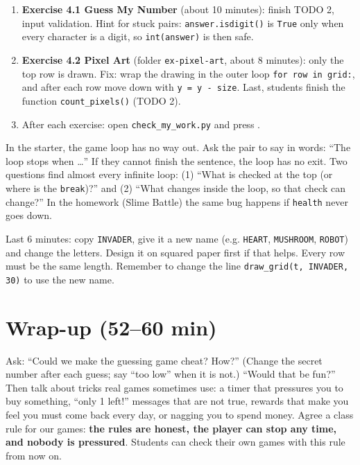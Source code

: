 \begin{enumerate}[leftmargin=1.4em]
  \item \textbf{Exercise 4.1 Guess My Number} (about 10 minutes): finish TODO 2, input validation. Hint for stuck pairs:
        \texttt{answer.isdigit()} is \texttt{True} only when every character is a digit, so \texttt{int(answer)} is then safe.
  \item \textbf{Exercise 4.2 Pixel Art} (folder \texttt{ex-pixel-art}, about 8 minutes): only the top row is drawn.
        Fix: wrap the drawing in the outer loop \texttt{for row in grid:}, and after each row move down
        with \texttt{y = y - size}. Last, students finish the function \texttt{count\_pixels()} (TODO 2).
  \item After each exercise: open \texttt{check\_my\_work.py} and press .
\end{enumerate}

\begin{bughunt}
In the starter, the game loop has no way out. Ask the pair to say in words: \enquote{The loop stops when \ldots{}} If they cannot finish the
sentence, the loop has no exit. Two questions find almost every infinite loop:
(1) \enquote{What is checked at the top (or where is the \texttt{break})?} and (2) \enquote{What changes inside the loop, so that check can change?}
In the homework (Slime Battle) the same bug happens if \texttt{health} never goes down.
\end{bughunt}

\begin{freebuild}
Last 6 minutes: copy \texttt{INVADER}, give it a new name (e.g. \texttt{HEART}, \texttt{MUSHROOM}, \texttt{ROBOT}) and change the letters.
Design it on squared paper first if that helps. Every row must be the same length. Remember to change the line
\texttt{draw\_grid(t, INVADER, 30)} to use the new name.
\end{freebuild}

\section{Wrap-up (52--60 min)}
\begin{safety}
Ask: \enquote{Could we make the guessing game cheat? How?} (Change the secret number after each guess; say \enquote{too low} when it is not.)
\enquote{Would that be fun?} Then talk about tricks real games sometimes use: a timer that pressures you to buy something,
\enquote{only 1 left!} messages that are not true, rewards that make you feel you must come back every day, or nagging you to spend money.
Agree a class rule for our games: \textbf{the rules are honest, the player can stop any time, and nobody is pressured}.
Students can check their own games with this rule from now on.
\end{safety}

